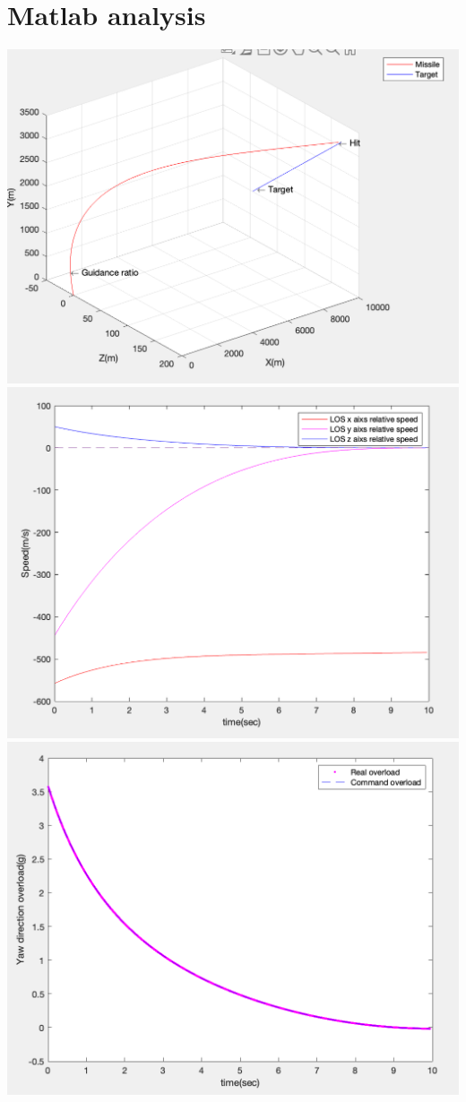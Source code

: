\documentclass{article}
\begin{document}
\section{Matlab analysis  }
\includegraphics[width=\textwidth]{report4.png}
\includegraphics[width=\textwidth]{report1.png}
\includegraphics[width=\textwidth]{report2.png}
\end{document}
